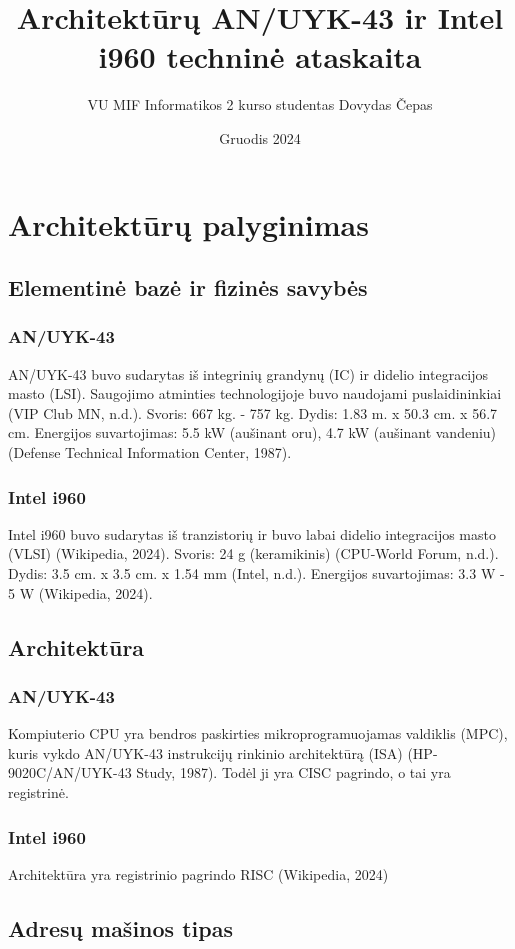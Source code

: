 \documentclass{article}
\title{Architektūrų AN/UYK-43 ir Intel i960 techninė ataskaita}
\author{VU MIF Informatikos 2 kurso studentas Dovydas Čepas}
\date{Gruodis 2024}
\begin{document}
\maketitle
\newpage
\section{Architektūrų palyginimas}
\subsection{Elementinė bazė ir fizinės savybės}
\subsubsection{AN/UYK-43}
AN/UYK-43 buvo sudarytas iš integrinių grandynų (IC) ir didelio integracijos masto (LSI). Saugojimo atminties technologijoje buvo naudojami puslaidininkiai (VIP Club MN, n.d.). Svoris: 667 kg. - 757 kg. Dydis: 1.83 m. x 50.3 cm. x 56.7 cm. Energijos suvartojimas: 5.5 kW (aušinant oru), 4.7 kW (aušinant vandeniu) (Defense Technical Information Center, 1987).

\subsubsection{Intel i960}
Intel i960 buvo sudarytas iš tranzistorių ir buvo labai didelio integracijos masto (VLSI) (Wikipedia, 2024). Svoris: 24 g (keramikinis) (CPU-World Forum, n.d.). Dydis: 3.5 cm. x 3.5 cm. x 1.54 mm (Intel, n.d.). Energijos suvartojimas: 3.3 W - 5 W (Wikipedia, 2024).

\subsection{Architektūra}
\subsubsection{AN/UYK-43}
Kompiuterio CPU yra bendros paskirties mikroprogramuojamas valdiklis (MPC), kuris vykdo AN/UYK-43 instrukcijų rinkinio architektūrą (ISA) (HP-9020C/AN/UYK-43 Study, 1987). Todėl ji yra CISC pagrindo, o tai yra registrinė.
\subsubsection{Intel i960}
Architektūra yra registrinio pagrindo RISC (Wikipedia, 2024)
\subsection{Adresų mašinos tipas}
\end{document}

